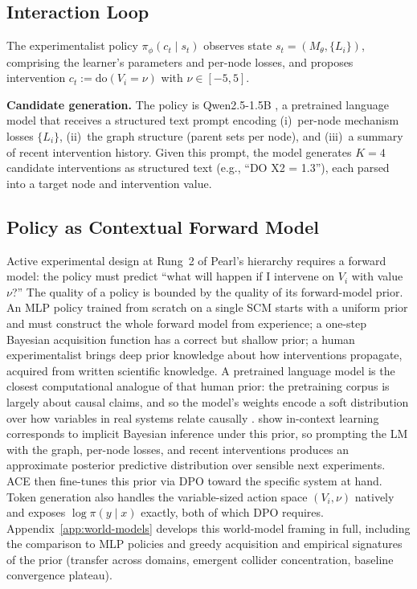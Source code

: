 \documentclass{article}
\theoremstyle{plain}
\theoremstyle{definition}
\theoremstyle{remark}
\begin{document}
\subsection{Interaction Loop}
\label{sec:interaction-loop}

The experimentalist policy $\pi_\phi(c_t \mid s_t)$ observes state $s_t = (M_\theta, \{L_i\})$, comprising the learner's parameters and per-node losses, and proposes intervention $c_t := \text{do}(V_i = \nu)$ with $\nu \in [-5, 5]$.

\textbf{Candidate generation.} The policy is Qwen2.5-1.5B \citep{qwen2_5}, a pretrained language model that receives a structured text prompt encoding (i)~per-node mechanism losses $\{L_i\}$, (ii)~the graph structure (parent sets per node), and (iii)~a summary of recent intervention history. Given this prompt, the model generates $K=4$ candidate interventions as structured text (e.g., ``DO X2 = 1.3''), each parsed into a target node and intervention value.

\subsection{Policy as Contextual Forward Model}
\label{sec:lm-policy}

Active experimental design at Rung~2 of Pearl's hierarchy requires a forward model: the policy must predict ``what will happen if I intervene on $V_i$ with value $\nu$?'' The quality of a policy is bounded by the quality of its forward-model prior. An MLP policy trained from scratch on a single SCM starts with a uniform prior and must construct the whole forward model from experience; a one-step Bayesian acquisition function has a correct but shallow prior; a human experimentalist brings deep prior knowledge about how interventions propagate, acquired from written scientific knowledge. A pretrained language model is the closest computational analogue of that human prior: the pretraining corpus is largely about causal claims, and so the model's weights encode a soft distribution over how variables in real systems relate causally \citep{hao2023reasoning,kiciman2023causal}. \citet{xie2022explanation} show in-context learning corresponds to implicit Bayesian inference under this prior, so prompting the LM with the graph, per-node losses, and recent interventions produces an approximate posterior predictive distribution over sensible next experiments. ACE then fine-tunes this prior via DPO toward the specific system at hand. Token generation also handles the variable-sized action space $(V_i,\nu)$ natively and exposes $\log\pi(y\mid x)$ exactly, both of which DPO requires. Appendix~\ref{app:world-models} develops this world-model framing in full, including the comparison to MLP policies and greedy acquisition and empirical signatures of the prior (transfer across domains, emergent collider concentration, baseline convergence plateau).
\end{document}
